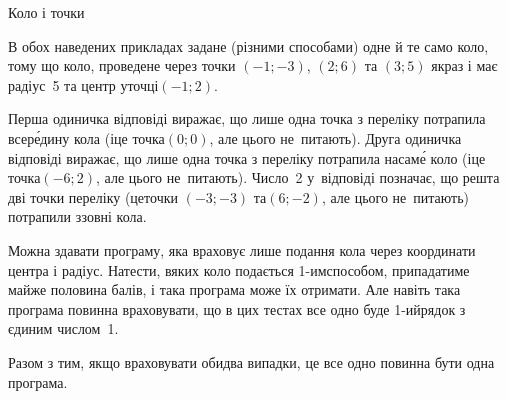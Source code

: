 \begin{problemAllDefault}{Коло і точки}
\Examples
\begin{exampleSimple}{7em}{3em}%
%
%
\end{exampleSimple}

\Notes
В обох наведених прикладах задане (різними способами) одне й те само коло, тому що коло, проведене через точки $(-1; -3)$, $(2; 6)$ та $(3; 5)$ якраз і має радіус~5 та центр у\nolinebreak[3] точці\nolinebreak[3] $(-1; 2)$.

Перша одиничка відповіді виражає, що лише одна точка з переліку потрапила всер\'{е}\-дину кола (і\nolinebreak[3] це точка\nolinebreak[3] $(0; 0)$, але цього не~питають). Друга одиничка відповіді виражає, що лише одна точка з переліку потрапила на\nolinebreak[3] сам\'{е} коло (і\nolinebreak[3] це точка\nolinebreak[3] $(-6; 2)$, але цього не~питають). Число~2 у~відповіді позначає, що решта дві точки переліку (це\nolinebreak[3] точки $(-3; -3)$ та\nolinebreak[3] $(6; -2)$, але цього не~питають) потрапили ззовні кола.

Можна здавати програму, яка враховує лише подання кола через координати центра і радіус. На\nolinebreak[3] тести, в\nolinebreak[3] яких коло подається \mbox{1-им}\nolinebreak[3] способом, припадатиме майже половина балів, і така програма може їх отримати. Але навіть така програма повинна враховувати, що в цих тестах все одно буде \mbox{1-ий}\nolinebreak[3] рядок з єдиним числом~1.

Разом з тим, якщо враховувати обидва випадки, це все одно повинна бути одна програма.

\end{problemAllDefault}
